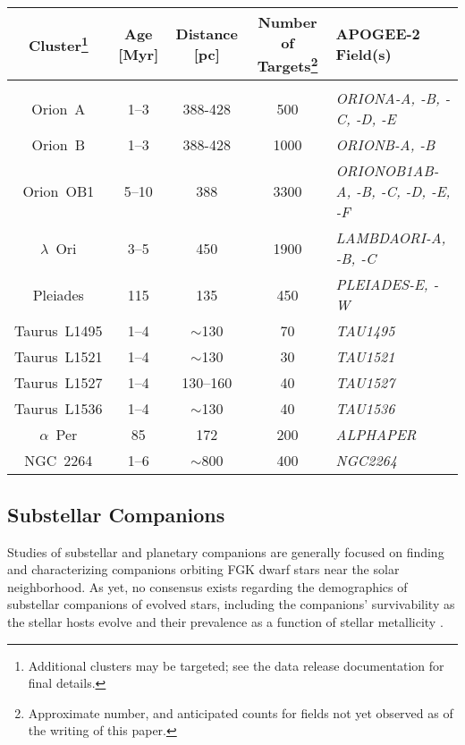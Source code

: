 \documentclass[12pt,twocolumn]{emulateapj}
\begin{document}
\begin{table*}[hpbt] \tablewidth{0 pt}
  \begin{center}
  \caption{Embedded Clusters Targeted in APOGEE-2}
  \begin{tabular}{c c c c l}
Cluster\footnote{Additional clusters may be targeted; see the data release documentation for final details.} & Age [Myr] & Distance [pc] & Number of Targets\footnote{Approximate number, and anticipated counts for fields not yet observed as of the writing of this paper.} & APOGEE-2 Field(s) \\
  \hline \\
Orion~A & 1--3 & 388-428 & 500 & {\it ORIONA-A, -B, -C, -D, -E} \\ %
Orion~B & 1--3 & 388-428 & 1000 & {\it ORIONB-A, -B} \\ %
Orion~OB1 & 5--10 & 388 & 3300 & {\it ORIONOB1AB-A, -B, -C, -D, -E, -F} \\ %
$\lambda$~Ori & 3--5 & 450 & 1900 & {\it LAMBDAORI-A, -B, -C} \\ %
Pleiades & 115 & 135 & 450 & {\it PLEIADES-E, -W} \\ %
Taurus~L1495 & 1--4 & $\sim$130 & 70 & {\it TAU1495} \\
Taurus~L1521 & 1--4 & $\sim$130 & 30 & {\it TAU1521} \\
Taurus~L1527 & 1--4 & 130--160 & 40 & {\it TAU1527} \\
Taurus~L1536 & 1--4 & $\sim$130 & 40 & {\it TAU1536} \\
$\alpha$~Per & 85 & 172 & 200 & {\it ALPHAPER} \\
NGC~2264 & 1--6 & $\sim$800 & 400 & {\it NGC2264}
  \end{tabular}
  \label{tab:insync_fields}
  \end{center}
\end{table*}


\subsection{Substellar Companions}
\label{sec:substellar}

Studies of substellar and planetary companions are generally focused on finding and characterizing companions orbiting FGK dwarf stars near the solar neighborhood.  As yet, no consensus exists regarding the demographics of substellar companions of evolved stars, including the companions' survivability as the stellar hosts evolve and their prevalence as a function of stellar metallicity \citep[like the metallicity-planet frequency trend seen in dwarf stars;][]{Fischer_2005_planetmetallicitycorr,Reffert_2015_evolvedstarplanets}.  
\end{document}
